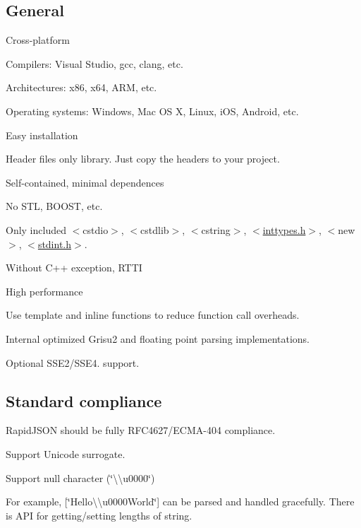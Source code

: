 \subsection*{General}


\begin{DoxyItemize}
\item Cross-\/platform
\begin{DoxyItemize}
\item Compilers\+: Visual Studio, gcc, clang, etc.
\item Architectures\+: x86, x64, A\+RM, etc.
\item Operating systems\+: Windows, Mac OS X, Linux, i\+OS, Android, etc.
\end{DoxyItemize}
\item Easy installation
\begin{DoxyItemize}
\item Header files only library. Just copy the headers to your project.
\end{DoxyItemize}
\item Self-\/contained, minimal dependences
\begin{DoxyItemize}
\item No S\+TL, B\+O\+O\+ST, etc.
\item Only included {\ttfamily $<$cstdio$>$}, {\ttfamily $<$cstdlib$>$}, {\ttfamily $<$cstring$>$}, {\ttfamily $<$\hyperlink{inttypes_8h_source}{inttypes.\+h}$>$}, {\ttfamily $<$new$>$}, {\ttfamily $<$\hyperlink{stdint_8h_source}{stdint.\+h}$>$}.
\end{DoxyItemize}
\item Without C++ exception, R\+T\+TI
\item High performance
\begin{DoxyItemize}
\item Use template and inline functions to reduce function call overheads.
\item Internal optimized Grisu2 and floating point parsing implementations.
\item Optional S\+S\+E2/\+S\+S\+E4. support.
\end{DoxyItemize}
\end{DoxyItemize}

\subsection*{Standard compliance}


\begin{DoxyItemize}
\item Rapid\+J\+S\+ON should be fully R\+F\+C4627/\+E\+C\+M\+A-\/404 compliance.
\item Support Unicode surrogate.
\item Support null character ({\ttfamily \char`\"{}\textbackslash{}\textbackslash{}u0000\char`\"{}})
\begin{DoxyItemize}
\item For example, {\ttfamily \mbox{[}\char`\"{}\+Hello\textbackslash{}\textbackslash{}u0000\+World\char`\"{}\mbox{]}} can be parsed and handled gracefully. There is A\+PI for getting/setting lengths of string.
\end{DoxyItemize}
\end{DoxyItemize}

